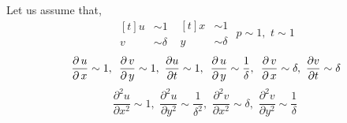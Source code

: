 \documentclass[../main-sheet.tex]{subfiles}
\begin{document}
\begin{soln}
    Let us assume that,
    \[\begin{aligned}[t]
        u&\sim 1\\
        v&\sim \delta
    \end{aligned}\,\,\begin{aligned}[t]
        x&\sim 1\\
        y&\sim \delta
    \end{aligned}\,\, p\sim 1,\,\, t\sim1\]
    \[\,\frac{\partial\, u}{\partial\, x}\sim1,\,\,\,\frac{\partial\, v}{\partial\, y}\sim 1,\,\,\frac{\partial u }{\partial t}\sim 1,\,\,\,\frac{\partial\, u}{\partial\, y}\sim\frac{1}{\delta},\,\,\,\frac{\partial\, v}{\partial\, x}\sim \delta,\,\,\frac{\partial v }{\partial t}\sim \delta\]
    \[\frac{\partial^2 u }{\partial x^2}\sim1,\,\,\frac{\partial^2 u }{\partial y^2}\sim \frac{1 }{\delta^2 },\,\,\frac{\partial^2 v }{\partial x^2}\sim \delta ,\,\,\frac{\partial^2 v }{\partial y^2}\sim\frac{1}{\delta}\]


\end{soln}
\end{document}
